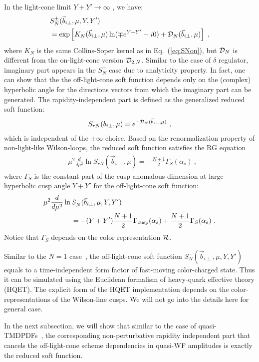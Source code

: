 \documentclass[twocolumn,superscriptaddress,longbibliography,10pt]{revtex4-1}
\begin{document}
In the light-cone limit $Y+Y'\rightarrow \infty$ , we have:
\begin{align}\label{eq:Sroff}
      &S^{\pm}_{N}(\vec{b}_{i\perp},\mu,Y,Y') \nonumber \\
      &={\rm exp}\left[ K_N(\vec{b}_{i\perp},\mu) \ln (\mp e^{Y+Y'}-i0) +{\cal D}_N(\vec{b}_{i\perp},\mu)\right]  \ ,
\end{align}
where $K_N$ is the same Collins-Soper kernel as in Eq.~(\ref{eq:SNon}), but ${\cal D}_N$ is different from the on-light-cone version ${\cal D}_{2,N}$.  Similar to the case of $\delta$ regulator, imaginary part appears in the $S_N^{+}$ case due to analyticity property. In fact, one can show that the the off-light-cone soft function depends only on the (complex) hyperbolic angle for the directions vectors from which the imaginary part can be generated. The rapidity-independent part is defined as the generalized reduced soft function:
\begin{align}
S_{rN}(b_{i\perp},\mu)=e^{-{\cal D}_N(\vec{b}_{i\perp},\mu)} \ ,
\end{align}
which is independent of the $\pm \infty$ choice. Based on the renormalization property of non-light-like Wilson-loops, the reduced soft function satisfies the RG equation
\begin{align}
   &\mu^2 \frac{d}{d\mu^2} \ln S_{rN}(\vec{b}_{i\perp},\mu)=-\frac{N+1}{2}\Gamma_S(\alpha_s)  \ ,
\end{align}
where $\Gamma_S$ is the constant part of the cusp-anomalous dimension at large hyperbolic cusp angle $Y+Y'$ for the off-light-cone soft function:
\begin{align}
&\mu^2 \frac{d}{d\mu^2} \ln S^{-}_{N}(\vec{b}_{i\perp},\mu,Y,Y')\nonumber \\
&\qquad\qquad=-(Y+Y')\frac{N+1}{2}\Gamma_{\rm cusp}(\alpha_s)+\frac{N+1}{2}\Gamma_S(\alpha_s) \ .
\end{align}
Notice that $\Gamma_S$ depends on the color representation ${\cal R}$.


Similar to the $N=1$ case~\cite{Ji:2019sxk}, the off-light-cone soft function $S^{-}_N(\vec{b}_{i\perp},\mu,Y,Y')$ equals to a time-independent form factor of fast-moving color-charged state. Thus it can be simulated using the Euclidean formalism of heavy-quark effective theory (HQET).
The explicit form of the HQET implementation depends on the color-representations of the Wilson-line cusps.
We will not go into the details here for general case.

In the next subsection, we will show that similar to the case of quasi-TMDPDFs~\cite{Ji:2019ewn}, the corresponding non-perturbative rapidity independent part that cancels the off-light-cone scheme dependencies in quasi-WF amplitudes is exactly the reduced soft function.
\end{document}
